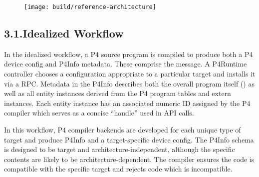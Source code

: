 \documentclass[11pt]{article}
\begin{document}
{%
\begin{figure}[tbp]%
\begin{mdcenter}%

\noindent{}\texttt{[image: build/reference-architecture]}{}%

\mdhr{}%

\noindent{}%
\end{mdcenter}\label{fig-reference-architecture}%
\end{figure}%

\subsection{3.1.\hspace*{0.5em}Idealized Workflow}\label{sec-idealized-workflow}%

\noindent{}In the idealized workflow, a P4 source program is compiled to produce both a P4
device config and P4Info metadata. These comprise the 
message. A P4Runtime controller chooses a configuration appropriate to a
particular target and installs it via a 
RPC. Metadata in the P4Info describes both the overall program itself
() as well as all entity instances derived from the P4 program \textemdash{}
tables and extern instances. Each entity instance has an associated numeric ID
assigned by the P4 compiler which serves as a concise \textquotedblleft{}handle\textquotedblright{} used in API
calls.%

In this workflow, P4 compiler backends are developed for each unique type of
target and produce P4Info and a target-specific device config. The P4Info schema
is designed to be target and architecture-independent, although the specific
contents are likely to be architecture-dependent. The compiler ensures the code
is compatible with the specific target and rejects code which is incompatible.%

}
\end{document}
